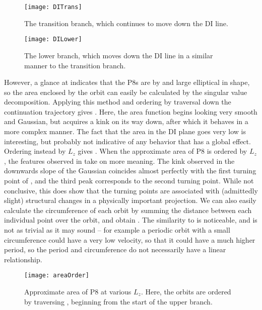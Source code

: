 \begin{figure}[h]
\texttt{[image: DITrans]}
\caption{The transition branch, which continues to move down the DI line.  }\label{fig:DITrans}
\end{figure}

\begin{figure}[h]
\texttt{[image: DILower]}
\caption{The lower branch, which moves down the DI line in a similar manner to the transition branch.}\label{fig:DILower}
\end{figure}

However, a glance at  indicates that the P8s are by and large elliptical in shape, so the area enclosed by the orbit can easily be calculated by the singular value decomposition. Applying this method and ordering by traversal down the continuation trajectory gives . Here, the area function begins looking very smooth and Gaussian, but acquires a kink on its way down, after which it behaves in a more complex manner. The fact that the area in the DI plane goes very low is interesting, but probably not indicative of any behavior that has a global effect. Ordering instead by $L_z$ gives . When the approximate area of P8 is ordered by $L_z$, the features observed in  take on more meaning. The kink observed in the downwards slope of the Gaussian coincides almost perfectly with the first turning point of , and the third peak corresponds to the second turning point. While not conclusive, this does show that the turning points are associated with (admittedly slight) structural changes in a physically important projection.  We can also easily calculate the circumference of each orbit by summing the distance between each individual point over the orbit, and obtain . The similarity to  is noticeable, and is not as trivial as it may sound -- for example a periodic orbit with a small circumference could have a very low velocity, so that it could have a much higher period, so the period and circumference do not necessarily have a linear relationship. \\

\begin{figure}[h!]
\texttt{[image: areaOrder]}
\caption{Approximate area of P8 at various $L_z$. Here, the orbits are ordered by traversing , beginning from the start of the upper branch.}\label{fig:areaOrder}
\end{figure}

